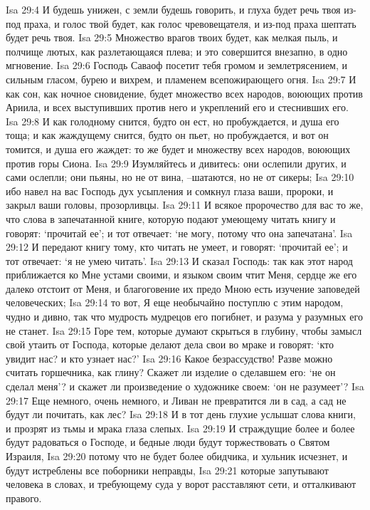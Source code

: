 Isa 29:4  И будешь унижен, с земли будешь говорить, и глуха будет речь твоя из-под праха, и голос твой будет, как голос чревовещателя, и из-под праха шептать будет речь твоя.
Isa 29:5  Множество врагов твоих будет, как мелкая пыль, и полчище лютых, как разлетающаяся плева; и это совершится внезапно, в одно мгновение.
Isa 29:6  Господь Саваоф посетит тебя громом и землетрясением, и сильным гласом, бурею и вихрем, и пламенем всепожирающего огня.
Isa 29:7  И как сон, как ночное сновидение, будет множество всех народов, воюющих против Ариила, и всех выступивших против него и укреплений его и стеснивших его.
Isa 29:8  И как голодному снится, будто он ест, но пробуждается, и душа его тоща; и как жаждущему снится, будто он пьет, но пробуждается, и вот он томится, и душа его жаждет: то же будет и множеству всех народов, воюющих против горы Сиона.
Isa 29:9  Изумляйтесь и дивитесь: они ослепили других, и сами ослепли; они пьяны, но не от вина, --шатаются, но не от сикеры;
Isa 29:10  ибо навел на вас Господь дух усыпления и сомкнул глаза ваши, пророки, и закрыл ваши головы, прозорливцы.
Isa 29:11  И всякое пророчество для вас то же, что слова в запечатанной книге, которую подают умеющему читать книгу и говорят: `прочитай ее'; и тот отвечает: `не могу, потому что она запечатана'.
Isa 29:12  И передают книгу тому, кто читать не умеет, и говорят: `прочитай ее'; и тот отвечает: `я не умею читать'.
Isa 29:13  И сказал Господь: так как этот народ приближается ко Мне устами своими, и языком своим чтит Меня, сердце же его далеко отстоит от Меня, и благоговение их предо Мною есть изучение заповедей человеческих;
Isa 29:14  то вот, Я еще необычайно поступлю с этим народом, чудно и дивно, так что мудрость мудрецов его погибнет, и разума у разумных его не станет.
Isa 29:15  Горе тем, которые думают скрыться в глубину, чтобы замысл свой утаить от Господа, которые делают дела свои во мраке и говорят: `кто увидит нас? и кто узнает нас?'
Isa 29:16  Какое безрассудство! Разве можно считать горшечника, как глину? Скажет ли изделие о сделавшем его: `не он сделал меня'? и скажет ли произведение о художнике своем: `он не разумеет'?
Isa 29:17  Еще немного, очень немного, и Ливан не превратится ли в сад, а сад не будут ли почитать, как лес?
Isa 29:18  И в тот день глухие услышат слова книги, и прозрят из тьмы и мрака глаза слепых.
Isa 29:19  И страждущие более и более будут радоваться о Господе, и бедные люди будут торжествовать о Святом Израиля,
Isa 29:20  потому что не будет более обидчика, и хульник исчезнет, и будут истреблены все поборники неправды,
Isa 29:21  которые запутывают человека в словах, и требующему суда у ворот расставляют сети, и отталкивают правого.
